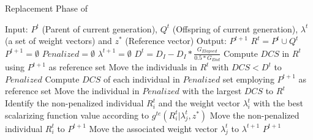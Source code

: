 \begin{algorithm}[t]
        \caption{Replacement Phase of \VSDMOEAD{}}
\begin{small}
\begin{algorithmic}[1]
\STATE Input: $P^t$ (Parent of current generation), $Q^t$ (Offspring of current generation), $\lambda^t$ (a set of weight vectors) and $z^*$ (Reference vector)
        \STATE Output: $P^{t+1}$
        \STATE $R^t = P^t \cup Q^t$\label{alg_2:1} 
        \STATE $P^{t+1} = \emptyset$ \label{alg_2:2}
        \STATE $Penalized = \emptyset$ \label{alg_2:3}
	\STATE $\lambda^{t+1} = \emptyset$ \label{alg_2:4}
        \STATE $D^t = D_I - D_I * \frac{G_{Elapsed}}{0.5*G_{End}}$ \label{alg_2:5} 
         \label{alg_2:6}
            \STATE Compute $DCS$ in $R^t$ using $P^{t+1}$ as reference set \label{alg_2:7}
            \STATE Move the individuals in $R^t$ with $DCS < D^t$ to $Penalized$ \label{alg_2:8}
                 \label{alg_2:9}
                    \STATE Compute $DCS$ of each individual in $Penalized$ set employing $P^{t+1}$ as reference set \label{alg_2:10}
                    \STATE Move the individual in $Penalized$ with the largest $DCS$ to $R^t$ \label{alg_2:11}
                \ENDIF \label{alg_2:12}
            \STATE Identify the non-penalized individual $R_i^t$ and the weight vector $\lambda_i^t$ with the best scalarizing function value according to $g^{te}(R_i^t | \lambda_j^t, z^*)$ \label{alg_2:13}
	    \STATE Move the non-penalized individual $R_i^t$ to $P^{t+1}$ \label{alg_2:14}
            \STATE Move the associated weight vector $\lambda^t_j$ to $\lambda^{t+1}$ \label{alg_2:15}
        \ENDWHILE \label{alg_2:16}
        \RETURN $P^{t+1}$ \label{alg_2:17}
        \end{algorithmic}
\end{small}
\label{alg:replacement}
\end{algorithm}

